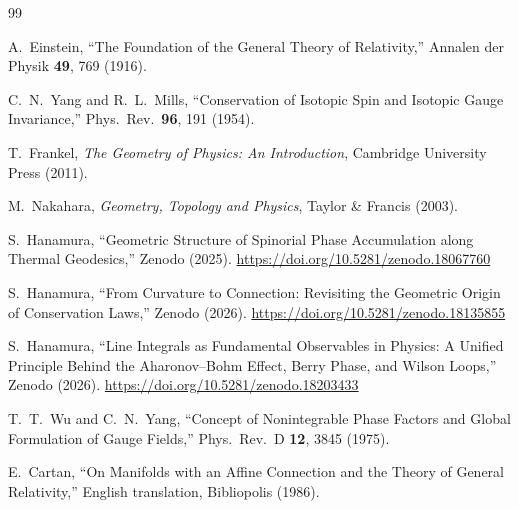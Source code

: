 \documentclass[12pt,letterpaper]{article} %
\begin{document}
\begin{thebibliography}{99}

A.~Einstein,
``The Foundation of the General Theory of Relativity,''
Annalen der Physik \textbf{49}, 769 (1916).

C.~N.~Yang and R.~L.~Mills,
``Conservation of Isotopic Spin and Isotopic Gauge Invariance,''
Phys.\ Rev.\ \textbf{96}, 191 (1954).

T.~Frankel,
\textit{The Geometry of Physics: An Introduction},
Cambridge University Press (2011).

M.~Nakahara,
\textit{Geometry, Topology and Physics},
Taylor \& Francis (2003).



S.~Hanamura, ``Geometric Structure of Spinorial Phase Accumulation along Thermal Geodesics,'' Zenodo (2025). \href{https://doi.org/10.5281/zenodo.18067760}{https://doi.org/10.5281/zenodo.18067760}

S.~Hanamura, ``From Curvature to Connection: Revisiting the Geometric Origin of Conservation Laws,'' Zenodo (2026). \href{https://doi.org/10.5281/zenodo.18135855}{https://doi.org/10.5281/zenodo.18135855}

S.~Hanamura, ``Line Integrals as Fundamental Observables in Physics: A Unified Principle Behind the Aharonov--Bohm Effect, Berry Phase, and Wilson Loops,'' Zenodo (2026). \href{https://doi.org/10.5281/zenodo.18203433}{https://doi.org/10.5281/zenodo.18203433}


T.~T.~Wu and C.~N.~Yang,
``Concept of Nonintegrable Phase Factors and Global Formulation of Gauge Fields,''
Phys.\ Rev.\ D \textbf{12}, 3845 (1975).

E.~Cartan,
``On Manifolds with an Affine Connection and the Theory of General Relativity,''
English translation, Bibliopolis (1986).

\end{thebibliography}
\end{document}

